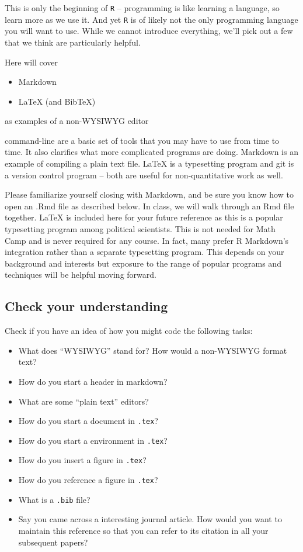 \documentclass[
  letterpaper,
]{book}
\providecommand{\tightlist}{%
  \setlength{\itemsep}{0pt}\setlength{\parskip}{0pt}}\usepackage{longtable,booktabs,array}
\theoremstyle{definition}
\theoremstyle{definition}
\theoremstyle{plain}
\theoremstyle{definition}
\theoremstyle{plain}
\theoremstyle{plain}
\theoremstyle{remark}
\begin{document}
This is only the beginning of \texttt{R} -- programming is like learning
a language, so learn more as we use it. And yet \texttt{R} is of likely
not the only programming language you will want to use. While we cannot
introduce everything, we'll pick out a few that we think are
particularly helpful.

Here will cover

\begin{itemize}
\tightlist
\item
  Markdown
\item
  LaTeX (and BibTeX)
\end{itemize}

as examples of a non-WYSIWYG editor

command-line are a basic set of tools that you may have to use from time
to time. It also clarifies what more complicated programs are doing.
Markdown is an example of compiling a plain text file. LaTeX is a
typesetting program and git is a version control program -- both are
useful for non-quantitative work as well.

Please familiarize yourself closing with Markdown, and be sure you know
how to open an .Rmd file as described below. In class, we will walk
through an Rmd file together. LaTeX is included here for your future
reference as this is a popular typesetting program among political
scientists. This is not needed for Math Camp and is never required for
any course. In fact, many prefer R Markdown's integration rather than a
separate typesetting program. This depends on your background and
interests but exposure to the range of popular programs and techniques
will be helpful moving forward.

\hypertarget{check-your-understanding-1}{%
\subsection*{Check your
understanding}\label{check-your-understanding-1}}

Check if you have an idea of how you might code the following tasks:

\begin{itemize}
\tightlist
\item
  What does ``WYSIWYG'' stand for? How would a non-WYSIWYG format text?
\item
  How do you start a header in markdown?
\item
  What are some ``plain text'' editors?
\item
  How do you start a document in \texttt{.tex}?
\item
  How do you start a environment in \texttt{.tex}?
\item
  How do you insert a figure in \texttt{.tex}?
\item
  How do you reference a figure in \texttt{.tex}?
\item
  What is a \texttt{.bib} file?
\item
  Say you came across a interesting journal article. How would you want
  to maintain this reference so that you can refer to its citation in
  all your subsequent papers?
\end{itemize}
\end{document}
